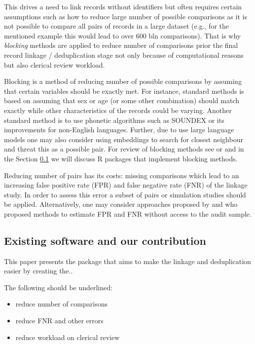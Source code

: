 This drives a need to link records without identifiers but often requires certain assumptions such as how to reduce large number of possible comparisons as it is not possible to compare all pairs of records in a large dataset (e.g., for the mentioned example this would lead to over 600 bln comparisons). That is why \emph{blocking} methods are applied to reduce number of comparisons prior the final record linkage / deduplication stage not only because of computational reasons but also clerical review workload.

Blocking is a method of reducing number of possible comparisons by assuming that certain variables should be exactly met. For instance, standard methods is based on assuming that sex or age (or some other combination) should match exactly while other characteristics of the records could be varying. Another standard method is to use phonetic algorithms such as SOUNDEX or its improvements for non-English languages. Further, due to use large language models one may also consider using embeddings to search for closest neighbour and threat this as a possible pair. For review of blocking methods see \citet{Steorts2014} or \citet{Papadakis2020} and in the Section \ref{sec-software} we will discuss R packages that implement blocking methods.

Reducing number of pairs has its costs: missing comparisons which lead to an increasing false positive rate (FPR) and false negative rate (FNR) of the linkage study. In order to assess this error a subset of pairs or simulation studies should be applied. Alternatively, one may consider approaches proposed by \citet{dasylva2021estimating} and \citet{dasylva2022consistent} who proposed methods to estimate FPR and FNR without access to the audit sample.

\subsection{Existing software and our contribution}\label{sec-software}

This paper presents the  package that aims to make the
linkage and deduplication easier by creating the..

The following should be underlined:

\begin{itemize}
\tightlist
\item
  reduce number of comparisons
\item
  reduce FNR and other errors
\item
  reduce workload on clerical review
\end{itemize}

